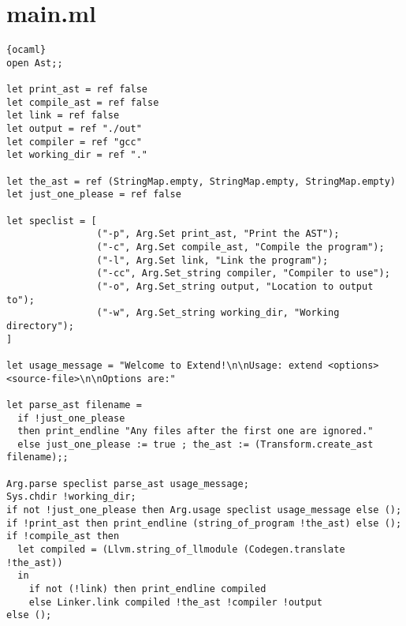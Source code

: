 \section{main.ml}
\begin{lstlisting}{ocaml}
open Ast;;

let print_ast = ref false
let compile_ast = ref false
let link = ref false
let output = ref "./out"
let compiler = ref "gcc"
let working_dir = ref "."

let the_ast = ref (StringMap.empty, StringMap.empty, StringMap.empty)
let just_one_please = ref false

let speclist = [
                ("-p", Arg.Set print_ast, "Print the AST");
                ("-c", Arg.Set compile_ast, "Compile the program");
                ("-l", Arg.Set link, "Link the program");
                ("-cc", Arg.Set_string compiler, "Compiler to use");
                ("-o", Arg.Set_string output, "Location to output to");
                ("-w", Arg.Set_string working_dir, "Working directory");
]

let usage_message = "Welcome to Extend!\n\nUsage: extend <options> <source-file>\n\nOptions are:"

let parse_ast filename =
  if !just_one_please
  then print_endline "Any files after the first one are ignored."
  else just_one_please := true ; the_ast := (Transform.create_ast filename);;

Arg.parse speclist parse_ast usage_message;
Sys.chdir !working_dir;
if not !just_one_please then Arg.usage speclist usage_message else ();
if !print_ast then print_endline (string_of_program !the_ast) else ();
if !compile_ast then
  let compiled = (Llvm.string_of_llmodule (Codegen.translate !the_ast))
  in
    if not (!link) then print_endline compiled
    else Linker.link compiled !the_ast !compiler !output
else ();
\end{lstlisting}
